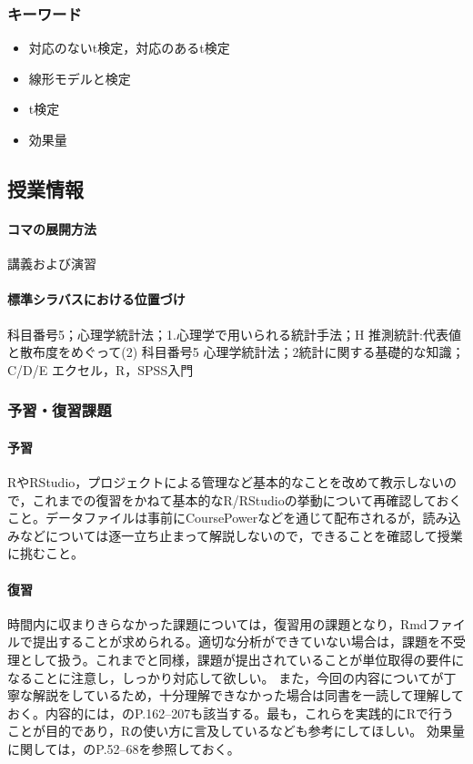 \subsubsection{キーワード}
\begin{itemize}
	\item 対応のないt検定，対応のあるt検定
	\item 線形モデルと検定
	\item t検定
	\item 効果量
\end{itemize}
\subsection{授業情報}
\paragraph{コマの展開方法}
講義および演習
\paragraph{標準シラバスにおける位置づけ}
科目番号5；心理学統計法；1.心理学で用いられる統計手法；H 推測統計:代表値と散布度をめぐって(2)
科目番号5 心理学統計法；2統計に関する基礎的な知識；C/D/E エクセル，R，SPSS入門
\subsubsection{予習・復習課題}
\paragraph{予習}
RやRStudio，プロジェクトによる管理など基本的なことを改めて教示しないので，これまでの復習をかねて基本的なR/RStudioの挙動について再確認しておくこと。データファイルは事前にCoursePowerなどを通じて配布されるが，読み込みなどについては逐一立ち止まって解説しないので，できることを確認して授業に挑むこと。
\paragraph{復習}
時間内に収まりきらなかった課題については，復習用の課題となり，Rmdファイルで提出することが求められる。適切な分析ができていない場合は，課題を不受理として扱う。これまでと同様，課題が提出されていることが単位取得の要件になることに注意し，しっかり対応して欲しい。
また，今回の内容について\citet{Hashimoto201607}が丁寧な解説をしているため，十分理解できなかった場合は同書を一読して理解しておく。内容的には，\citet{Yamada2004}のP.162--207も該当する。最も，これらを実践的にRで行うことが目的であり，Rの使い方に言及している\citet{kosugi2019}なども参考にしてほしい。
効果量に関しては，\citet{Matia201201}のP.52--68を参照しておく。